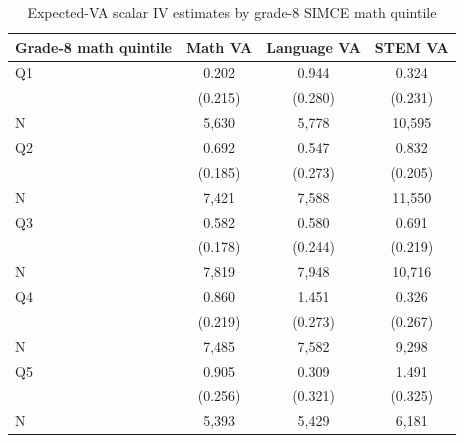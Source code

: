 \begin{table}[!htbp]
\centering
\caption{Expected-VA scalar IV estimates by grade-8 SIMCE math quintile}
\label{tab:scalar_school_value_iv_expected_va_by_simce8_math_quintile}
\begin{tabular}{lccc}
\toprule
Grade-8 math quintile & Math VA & Language VA & STEM VA \\
\midrule
Q1 & 0.202 & 0.944 & 0.324 \\
 & (0.215) & (0.280) & (0.231) \\
N & 5,630 & 5,778 & 10,595 \\
Q2 & 0.692 & 0.547 & 0.832 \\
 & (0.185) & (0.273) & (0.205) \\
N & 7,421 & 7,588 & 11,550 \\
Q3 & 0.582 & 0.580 & 0.691 \\
 & (0.178) & (0.244) & (0.219) \\
N & 7,819 & 7,948 & 10,716 \\
Q4 & 0.860 & 1.451 & 0.326 \\
 & (0.219) & (0.273) & (0.267) \\
N & 7,485 & 7,582 & 9,298 \\
Q5 & 0.905 & 0.309 & 1.491 \\
 & (0.256) & (0.321) & (0.325) \\
N & 5,393 & 5,429 & 6,181 \\
\bottomrule
\end{tabular}
\end{table}
